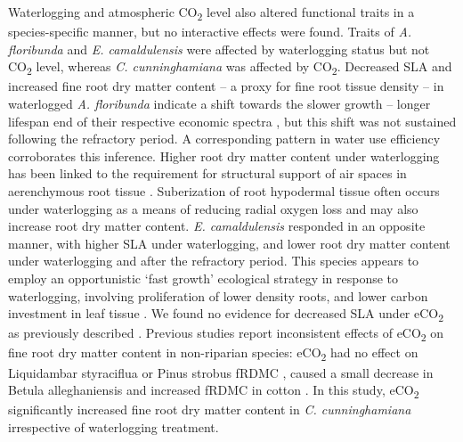 \documentclass[12pt,a4paper]{memoir}
\begin{document}
Waterlogging and atmospheric CO\textsubscript{2} level also altered functional traits in a species-specific manner, but no interactive effects were found. Traits of \textit{A. floribunda} and \textit{E. camaldulensis} were affected by waterlogging status but not CO\textsubscript{2} level, whereas \textit{C. cunninghamiana} was affected by CO\textsubscript{2}. Decreased SLA and increased fine root dry matter content – a proxy for fine root tissue density \citep{Birouste2013} – in waterlogged \textit{A. floribunda} indicate a shift towards the slower growth – longer lifespan  end of their respective economic spectra \citep{Reich2014}, but this shift was not sustained following the refractory period. A corresponding pattern in water use efficiency corroborates this inference. Higher root dry matter content under waterlogging has been linked to the requirement for structural support of air spaces in aerenchymous root tissue \citep{Ryser2011}. Suberization of root hypodermal tissue often occurs under waterlogging as a means of reducing radial oxygen loss \citep{Visser2000, DeSimone2002} and may also increase root dry matter content. \textit{E. camaldulensis} responded in an opposite manner, with higher SLA under waterlogging, and lower root dry matter content under waterlogging and after the refractory period. This species appears to employ an opportunistic ‘fast growth’ ecological strategy in response to waterlogging, involving proliferation of lower density roots, and lower carbon investment in leaf tissue \citep{Wright2004, Reich2014}. We found no evidence for decreased SLA under eCO\textsubscript{2} as previously described \citep{Poorter2003a}. Previous studies report inconsistent effects of eCO\textsubscript{2} on fine root dry matter content in non-riparian species: eCO\textsubscript{2} had no effect on Liquidambar styraciflua or Pinus strobus fRDMC \citep{Bauer2001,Iversen2008}, caused a small decrease in Betula alleghaniensis \citep{Bauer2001} and increased fRDMC in cotton \citep{Prior1994}. In this study, eCO\textsubscript{2} significantly increased fine root dry matter content in \textit{C. cunninghamiana} irrespective of waterlogging treatment.
\end{document}
